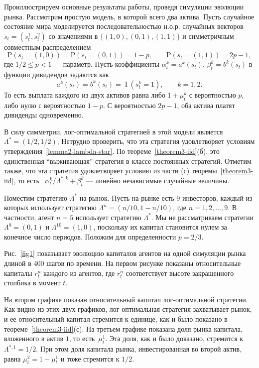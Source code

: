 \documentclass[a4paper,12pt,russian]{article} %
\theoremstyle{definition}
\DeclareMathOperator{\I}{I}
\renewcommand{\P}{\mathrm{P}}
\begin{document}
Проиллюстрируем основные результаты работы, проведя симуляции эволюции рынка. Рассмотрим простую модель, в которой всего два актива.
Пусть случайное состояние мира моделируется последовательностью н.о.р. случайных векторов
 $s_t=(s_t^1,s_t^2)$  со значениями в $\{(1,0), (0,1), (1,1)\}$ и симметричным совместным распределением
\[
\P(s_t = (1,0)) = \P(s_t=(0,1)) = 1-p, \qquad \P(s_t=(1,1)) = 2p-1,
\]
где $1/2\le p< 1$ — параметр. Пусть коэффициенты $\alpha_{t}^k = a^k(s_t)$, $\beta_{t}^k = b^k(s_t)$ в функции дивидендов задаются как
\[
a^k(s_t) = b^k(s_t) = \I(s_t^k=1), \qquad k=1,2.
\]
То есть выплата каждого из двух активов равна либо $1 + \mu_{t}^k$ с вероятностью $p$, либо нулю с вероятностью $1-p$.
С вероятностью $2p-1$, оба актива платят дивиденды одновременно. 

В силу симметрии, лог-оптимальной стратегией в этой модели является $\Lambda^*=(1/2, 1/2)$; Нетрудно проверить, что эта стратегия удовлетворяет условиям утверждения~\ref{lemma2-lambda-star}. 
По теореме~\ref{theorem3-iid}(б), это единственная ``выживающая'' стратегия в классе постоянных стратегий.
Отметим также, что эта стратегия удовлетворяет условию из части (с)  теоремы~\ref{theorem3-iid}, то есть \ $\alpha_{t}^k/\Lambda^{*,k} + \beta_{t}^k$ — линейно независимые случайные величины.

Поместим стратегию $\Lambda^*$ на рынок.
Пусть на рынке есть 9 инвесторов, каждый из которых использует стратегию $\Lambda^n = (n/10, 1-n/10)$, где $n=1,2,\dots,9$. В частности, агент $n=5$ использует стратегию $\Lambda^*$.
Мы не рассматриваем стратегии $\Lambda^0=(0,1)$ и $\Lambda^{10} = (1,0)$, поскольку их капитал становится нулем за конечное число периодов. Положим для определенности $p=2/3$.

Рис.~\ref{fig1} показывает эволюцию капиталов агентов на одной симуляции рынка длиной в 400 шагов по времени. 
На первом рисунке показаны относительные капиталы  $r_t^n$ каждого из агентов, где $r_t^n$ соответствует высоте закрашенного столбика в момент $t$.

На втором графике показан относительный капитал лог-оптимальной стратегии.
Как видно из этих двух графиков, лог-оптимальная стратегия захватывает рынок, и ее относительный капитал стремится к единице, как и было показано в теореме~\ref{theorem3-iid}(с).
На третьем графике показана доля рынка капитала, вложенного в актив $1$, то есть\ $\mu_{t}^1$. Эта доля, как и было доказано, стремится к $\Lambda^{*,1} = 1/2$. При этом доля капитала рынка, инвестированная во второй актив, равна $\mu_{t}^2 = 1-\mu_{t}^1$ и тоже стремится к $1/2$.
\end{document}
